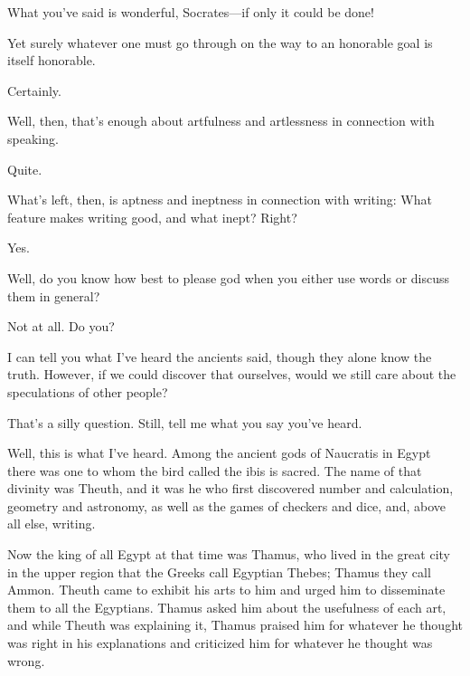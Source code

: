 \sayphaedrus What you’ve said is wonderful, Socrates---if only it could be
done!

\saysocrates Yet surely whatever one must go through on the way to
an honorable goal is itself honorable.

\sayphaedrus Certainly.

\saysocrates Well, then, that’s enough about artfulness and artlessness in
connection with speaking.

\sayphaedrus Quite.

\saysocrates What’s left, then, is aptness and ineptness in connection with
writing: What feature makes writing good, and what inept? Right?

\sayphaedrus Yes.

\saysocrates Well, do you know how best to please god when you either use
words or discuss them in general?

\sayphaedrus Not at all. Do you?

\saysocrates I can tell you what I’ve heard the ancients said, though they 
alone know the truth. However, if we could discover that
ourselves, would we still care about the speculations of other people?

\sayphaedrus That’s a silly question. Still, tell me what you say you’ve
heard.

\saysocrates Well, this is what I’ve heard. Among the ancient gods of
Naucratis in Egypt
there was one to whom the bird called the ibis is sacred. The name of
that divinity was
Theuth, and it was he
who first discovered number and calculation, geometry and astronomy, as
well as the games of checkers and dice, and, above all else,
writing.

Now the king of all Egypt at that time was
Thamus, who lived in
the great city in the upper region that the Greeks call Egyptian Thebes;
Thamus they call
Ammon. Theuth came to
exhibit his arts to him and urged him to disseminate them to all the
Egyptians. Thamus asked him about the usefulness of each art, and while
Theuth was explaining it, Thamus praised him for whatever he
thought was right in his explanations and criticized him for whatever he
thought was wrong.

